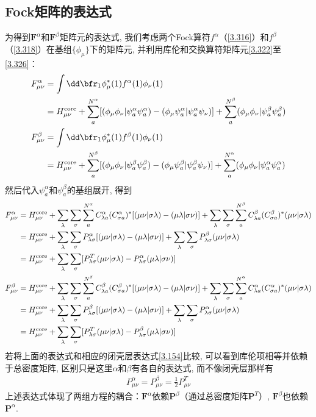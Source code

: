 \subsection{Fock矩阵的表达式}
为得到$\mathbf{F}^\alpha$和$\mathbf{F}^\beta$矩阵元的表达式, 我们考虑两个Fock算符$f^\alpha$（\autoref{3.316}）和$f^\beta$（\autoref{3.318}）在基组$\{\phi_\mu\}$下的矩阵元, 
并利用库伦和交换算符矩阵元\autoref{3.322}至\autoref{3.326}：
\begin{align}
	F^\alpha_{\mu\nu} &= \int{\dd\bfr_1}\phi^*_\mu(1)f^\alpha(1)\phi_\nu(1) \notag \\
	&=H^{\text{core}}_{\mu\nu}+\sum^{N^\alpha}_a[(\phi_\mu\phi_\nu|\psi^\alpha_a\psi^\alpha_a)-(\phi_\mu\psi^\alpha_a|\psi^\alpha_a\psi_\nu)]+\sum^{N^\beta}_a(\phi_\mu\phi_\nu|\psi^\beta_a\psi^\beta_a) \label{3.346} \\
	F^\beta_{\mu\nu} &= \int{\dd\bfr_1}\phi^*_\mu(1)f^\beta(1)\phi_\nu(1) \notag \\
	&=H^{\text{core}}_{\mu\nu}+\sum^{N^\beta}_a[(\phi_\mu\phi_\nu|\psi^\beta_a\psi^\beta_a)-(\phi_\mu\psi^\beta_a|\psi^\beta_a\psi_\nu)]+\sum^{N^\alpha}_a(\phi_\mu\phi_\nu|\psi^\alpha_a\psi^\alpha_a) \label{3.347}
\end{align}
然后代入$\psi^\alpha_a$和$\psi^\beta_a$的基组展开, 得到
\begin{align}
	F^\alpha_{\mu\nu} &=H^{\text{core}}_{\mu\nu}+\sum_\lambda\sum_\sigma\sum^{N^\alpha}_a C^\alpha_{\lambda a}(C^\alpha_{\sigma a})^*[(\mu\nu|\sigma\lambda)-(\mu\lambda|\sigma\nu)]+\sum_\lambda\sum_\sigma\sum^{N^\beta}_a C^{\beta}_{\lambda a}(C^\beta_{\sigma a})^* (\mu\nu|\sigma\lambda) \notag \\
	&=H^{\text{core}}_{\mu\nu}+\sum_\lambda\sum_\sigma P^\alpha_{\lambda\sigma}[(\mu\nu|\sigma\lambda)-(\mu\lambda|\sigma\nu)]+\sum_\lambda\sum_\sigma P^\beta_{\lambda\sigma}(\mu\nu|\sigma\lambda) \notag \\
	&=H^{\text{core}}_{\mu\nu}+\sum_\lambda\sum_\sigma [P^T_{\lambda\sigma}(\mu\nu|\sigma\lambda)- P^\alpha_{\lambda\sigma}(\mu\lambda|\sigma\nu)] \label{3.348} \\
	F^\beta_{\mu\nu} &=H^{\text{core}}_{\mu\nu}+\sum_\lambda\sum_\sigma\sum^{N^\beta}_a  C^\beta_{\lambda a}(C^\beta_{\sigma a})^*[(\mu\nu|\sigma\lambda)-(\mu\lambda|\sigma\nu)]+\sum_\lambda\sum_\sigma\sum^{N^\alpha}_a C^{\alpha}_{\lambda a}(C^\alpha_{\sigma a})^* (\mu\nu|\sigma\lambda) \notag \\
	&=H^{\text{core}}_{\mu\nu}+\sum_\lambda\sum_\sigma P^\beta_{\lambda\sigma}[(\mu\nu|\sigma\lambda)-(\mu\lambda|\sigma\nu)]+\sum_\lambda\sum_\sigma P^\alpha_{\lambda\sigma}(\mu\nu|\sigma\lambda) \notag \\
	&=H^{\text{core}}_{\mu\nu}+\sum_\lambda\sum_\sigma [P^T_{\lambda\sigma}(\mu\nu|\sigma\lambda)- P^\beta_{\lambda\sigma}(\mu\lambda|\sigma\nu)] \label{3.349}
\end{align}
若将上面的表达式和相应的闭壳层表达式\autoref{3.154}比较, 可以看到库伦项相等并依赖于总密度矩阵, 区别只是这里$\alpha$和$\beta$有各自的表达式, 而不像闭壳层那样有
\begin{align}
	P^\alpha_{\mu\nu}=P^\beta_{\mu\nu}=\frac{1}{2}P^T_{\mu\nu}
\end{align}
上述表达式体现了两组方程的耦合：$\mathbf{F}^\alpha$依赖$\mathbf{P}^\beta$（通过总密度矩阵$\mathbf{P}^T$）, $\mathbf{F}^\beta$也依赖$\mathbf{P}^\alpha$. 
